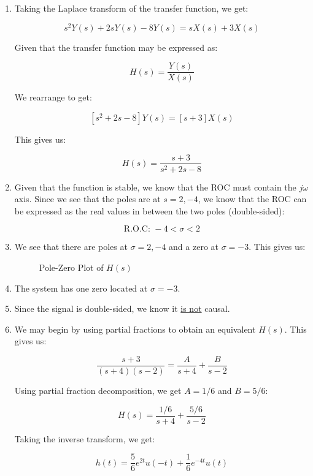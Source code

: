 \begin{enumerate}[label=\Alph*.]

  \item Taking the Laplace transform of the transfer function, we get:

    $$s^2Y(s)+2sY(s)-8Y(s)=sX(s)+3X(s)$$

    Given that the transfer function may be expressed as:

    $$H(s)=\frac{Y(s)}{X(s)}$$

    We rearrange to get:

    $$[s^2+2s-8]Y(s)=[s+3]X(s)$$

    This gives us:

    $$\boxed{H(s)=\frac{s+3}{s^2+2s-8}}$$

  \item Given that the function is stable, we know that the ROC must contain the $j\omega$ axis. Since we see that the poles are at $s=2,-4$, we know that the ROC can be expressed as the real values in between the two poles (double-sided):

    $$\boxed{\text{R.O.C: }-4<\sigma<2}$$

  \item We see that there are poles at $\sigma=2,-4$ and a zero at $\sigma=-3$. This gives us:

    \begin{figure}[H]
      \centering
      
      \caption{Pole-Zero Plot of $H(s)$}
      \label{fig:1}
    \end{figure}

  \item The system has one zero located at $\sigma=-3$.

  \item Since the signal is double-sided, we know it \underline{is not} causal.

  \item We may begin by using partial fractions to obtain an equivalent $H(s)$. This gives us:

    $$\frac{s+3}{(s+4)(s-2)}=\frac{A}{s+4}+\frac{B}{s-2}$$

    Using partial fraction decomposition, we get $A=1/6$ and $B=5/6$:

    $$H(s)=\frac{1/6}{s+4}+\frac{5/6}{s-2}$$

    Taking the inverse transform, we get:

    $$\boxed{h(t)=\frac{5}{6}e^{2t}u(-t)+\frac{1}{6}e^{-4t}u(t)}$$


\end{enumerate}
